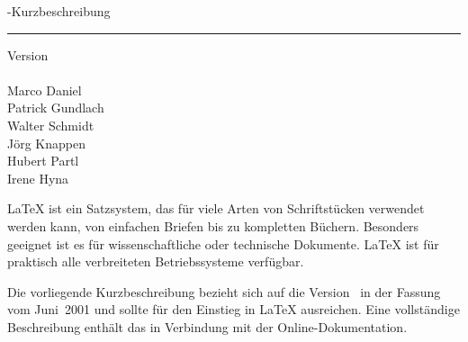 
\begin{titlepage}
\renewcommand{\thefootnote}{\fnsymbol{footnote}}
{\Huge%
\selectfont
\raggedright
\sbLaTeXe-Kurzbeschreibung
\rule{\textwidth}{0.75pt}
\par
}
\begin{flushleft}
  \normalsize
  \selectfont
  Version \lkver\\
  \lkdate\\[2ex]
  Marco Daniel\\
  Patrick Gundlach\\
  Walter Schmidt\\
  Jörg Knappen\\
  Hubert Partl%
    \\
  Irene Hyna%
  \\
\end{flushleft}

\vfill

{\parindent=0cm
\LaTeX{} ist ein Satzsystem, das für viele Arten von
Schriftstücken verwendet werden kann, von einfachen Briefen bis zu
kompletten Büchern.  Besonders geeignet ist es für
wissenschaftliche oder technische Dokumente. \LaTeX{} ist für
praktisch alle verbreiteten Betriebssysteme verfügbar.

Die vorliegende Kurzbeschreibung bezieht sich auf die Version
\LaTeXe\ in der Fassung vom Juni~2001 und sollte für den
Einstieg in \LaTeX{} ausreichen.
Eine vollständige Beschreibung enthält das \manual{}
in Verbindung mit der Online-Dokumentation.
}
\setcounter{footnote}{0}
\end{titlepage}


